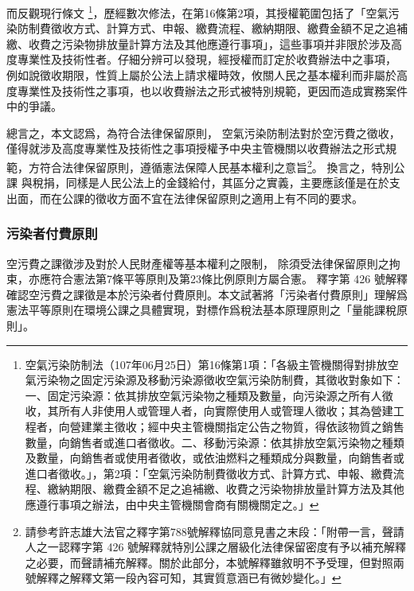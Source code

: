 \documentclass[12pt,a4paper]{article}
\begin{document}
而反觀現行條文
\footnote{空氣污染防制法（107年06月25日）第16條第1項：「各級主管機關得對排放空氣污染物之固定污染源及移動污染源徵收空氣污染防制費，其徵收對象如下：一、固定污染源：依其排放空氣污染物之種類及數量，向污染源之所有人徵收，其所有人非使用人或管理人者，向實際使用人或管理人徵收；其為營建工程者，向營建業主徵收；經中央主管機關指定公告之物質，得依該物質之銷售數量，向銷售者或進口者徵收。二、移動污染源：依其排放空氣污染物之種類及數量，向銷售者或使用者徵收，或依油燃料之種類成分與數量，向銷售者或進口者徵收。」，第2項：「空氣污染防制費徵收方式、計算方式、申報、繳費流程、繳納期限、繳費金額不足之追補繳、收費之污染物排放量計算方法及其他應遵行事項之辦法，由中央主管機關會商有關機關定之。」}，歷經數次修法，在第16條第2項，其授權範圍包括了「空氣污染防制費徵收方式、計算方式、申報、繳費流程、繳納期限、繳費金額不足之追補繳、收費之污染物排放量計算方法及其他應遵行事項」，這些事項并非限於涉及高度專業性及技術性者。仔細分辨可以發現，經授權而訂定於收費辦法中之事項，
例如說徵收期限，性質上屬於公法上請求權時效，攸關人民之基本權利而非屬於高度專業性及技術性之事項，也以收費辦法之形式被特別規範，更因而造成實務案件中的爭議。


總言之，本文認爲，為符合法律保留原則，
空氣污染防制法對於空污費之徵收，僅得就涉及高度專業性及技術性之事項授權予中央主管機關以收費辦法之形式規範，方符合法律保留原則，遵循憲法保障人民基本權利之意旨\footnote{請參考許志雄大法官之釋字第788號解釋協同意見書之末段：「附帶一言，聲請人之一認釋字第 426 號解釋就特別公課之層級化法律保留密度有予以補充解釋之必要，而聲請補充解釋。關於此部分，本號解釋雖敘明不予受理，但對照兩號解釋之解釋文第一段內容可知，其實質意涵已有微妙變化。」}。
換言之，特別公課 與稅捐，同樣是人民公法上的金錢給付，其區分之實義，主要應該僅是在於支出面，而在公課的徵收方面不宜在法律保留原則之適用上有不同的要求。

\subsubsection{污染者付費原則}
空污費之課徵涉及對於人民財產權等基本權利之限制，
除須受法律保留原則之拘束，亦應符合憲法第7條平等原則及第23條比例原則方屬合憲。
釋字第 426 號解釋確認空污費之課徵是本於污染者付費原則。本文試著將「污染者付費原則」理解爲憲法平等原則在環境公課之具體實現，對標作爲稅法基本原理原則之「量能課稅原則」。
\end{document}
